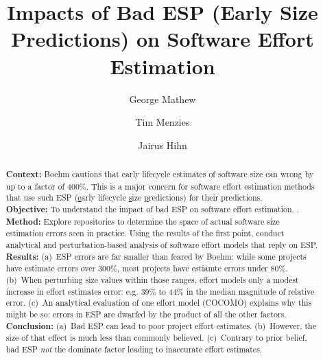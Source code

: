 \documentclass[final,twocolumn,5p]{elsarticle}
\theoremstyle{break}
\begin{document}
\begin{frontmatter}
\title{ Impacts of Bad ESP (Early Size Predictions) on Software Effort Estimation}
\author{George Mathew}
\author{Tim Menzies}
\author{Jairus Hihn}
\address{Department of Computer Science, North Carolina State University, Raleigh, NC, USA,\\
Jet Propulsion Laboratory, Pasadena, CA}




\begin{abstract}
  \textbf{Context:}
  Boehm cautions that early lifecycle estimates of software size
  can wrong by up to a factor of 400\%. This is a
  major concern for software effort estimation methods that use such ESP
  (\underline{e}arly lifecycle \underline{s}ize \underline{p}redictions)
  for their predictions.\\
  \textbf{Objective:} To understand the impact of  bad ESP on software effort
  estimation. .\\
\textbf{Method:} Explore repositories to determine the space of actual software
size estimation errors seen in practice.  Using the results of the first point, conduct
analytical and perturbation-based  analysis of software
effort models that reply on ESP. \\
\textbf{Results:} (a)~ESP errors are far smaller than   feared by Boehm:
while some
projects have estimate errors over 300\%, most
projects have estiamte errors under  80\%. 
(b)~When perturbing size values within those ranges,
effort models 
only a modest increase in effort estimates error: e.g. 39\% to 44\% in the  median magnitude of relative error. (c)~An analytical evaluation of one effort
model (COCOMO) explains why this might be so:   errors in ESP
are dwarfed by the product of all the other factors.\\
\textbf{Conclusion:} (a)~Bad ESP can lead to poor project effort estimates. (b)~However,
the size of that effect is much less than commonly believed.
(c)~Contrary to prior belief, bad ESP {\em not} the dominate factor leading to inaccurate effort estimates.
\end{abstract}
\end{frontmatter}
\end{document}

